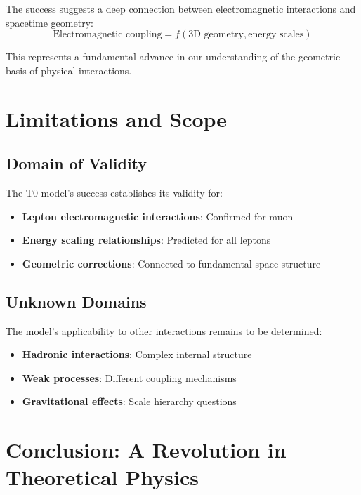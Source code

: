 \documentclass[12pt,a4paper]{report}
\begin{document}
The success suggests a deep connection between electromagnetic interactions and spacetime geometry:
\begin{equation}
	\text{Electromagnetic coupling} = f(\text{3D geometry}, \text{energy scales})
	\label{eq:electromagnetic_geometry}
\end{equation}

This represents a fundamental advance in our understanding of the geometric basis of physical interactions.

\section{Limitations and Scope}
\label{sec:limitations_scope}

\subsection{Domain of Validity}
\label{subsec:domain_validity}

The T0-model's success establishes its validity for:
\begin{itemize}
	\item \textbf{Lepton electromagnetic interactions}: Confirmed for muon
	\item \textbf{Energy scaling relationships}: Predicted for all leptons
	\item \textbf{Geometric corrections}: Connected to fundamental space structure
\end{itemize}

\subsection{Unknown Domains}
\label{subsec:unknown_domains}

The model's applicability to other interactions remains to be determined:
\begin{itemize}
	\item \textbf{Hadronic interactions}: Complex internal structure
	\item \textbf{Weak processes}: Different coupling mechanisms
	\item \textbf{Gravitational effects}: Scale hierarchy questions
\end{itemize}

\section{Conclusion: A Revolution in Theoretical Physics}
\label{sec:conclusion}
\end{document}
